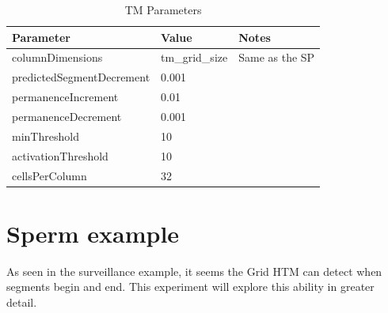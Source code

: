 \begin{table}[H]
    \centering
    \begin{tabularx}{\linewidth}{@{}XlX@{}}
        \toprule
        \textbf{Parameter}        & \textbf{Value} & \textbf{Notes} \\
        \midrule
        columnDimensions          & tm\_grid\_size & Same as the SP \\
        predictedSegmentDecrement & 0.001          &                \\
        permanenceIncrement       & 0.01           &                \\
        permanenceDecrement       & 0.001          &                \\
        minThreshold              & 10             &                \\
        activationThreshold       & 10             &                \\
        cellsPerColumn            & 32             &                \\
        \bottomrule
    \end{tabularx}
    \caption{TM Parameters}
    \label{tab:surveillance_tm}
\end{table}
\clearpage
\section{Sperm example}
As seen in the surveillance example, it seems the Grid HTM can detect when segments begin and end. This experiment will explore this ability in greater detail.
